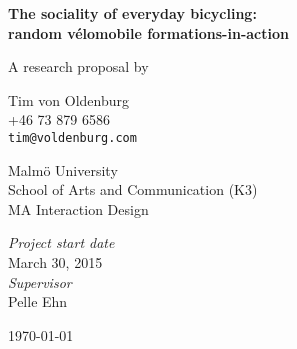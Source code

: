 \begin{titlepage}

\begin{center}

\begin{minipage}{0.86\textwidth}
\begin{flushleft} \large
\vspace*{2.0cm}
\begin{spacing}{1.0}
{ \huge \bfseries The sociality of everyday bicycling: \\
random vélomobile formations-in-action}
\end{spacing}
\vspace*{2.0cm}
{\large A research proposal by}
\end{flushleft}
\end{minipage}

\vspace*{1.0cm}

\begin{minipage}{0.86\textwidth}
\begin{flushleft} \large
  {\Large Tim von Oldenburg}\\
\vspace*{0.2cm}
+46 73 879 6586\\
\texttt{tim@voldenburg.com}
\end{flushleft}
\end{minipage}

\vspace*{2.5cm}

\begin{minipage}{0.86\textwidth}
\begin{flushright} \large
Malmö University\\
School of Arts and Communication (K3)\\
MA Interaction Design
\end{flushright}
\end{minipage}


\vspace*{1cm}


\begin{minipage}{0.86\textwidth}
\begin{flushright} \large
\emph{Project start date} \\
March 30, 2015\\
\vspace*{1cm}
\emph{Supervisor}\\
Pelle Ehn
\end{flushright}
\end{minipage}

\vspace*{2.5cm}

{\large \today}

\vfill

\end{center}
\end{titlepage}

